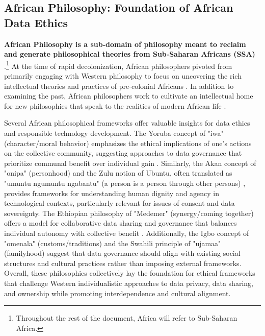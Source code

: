 \subsection{African Philosophy: Foundation of African Data Ethics}
 \textbf{African Philosophy is a sub-domain of philosophy meant to reclaim and generate philosophical theories from Sub-Saharan Africans (SSA)} \cite{ramose2004struggle}.\footnote{Throughout the rest of the document, Africa will refer to Sub-Saharan Africa.} 
At the time of rapid decolonization, African philosophers pivoted from primarily engaging with Western philosophy to focus on uncovering the rich intellectual theories and practices of pre-colonial Africans \cite{wiredu2004akan}. In addition to examining the past, African philosophers work to cultivate an intellectual home for new philosophies that speak to the realities of modern African life \cite{ramose2004struggle, kohnert2022machine}. 

Several African philosophical frameworks offer valuable insights for data ethics and responsible technology development. The Yoruba concept of "iwa" (character/moral behavior) emphasizes the ethical implications of one's actions on the collective community, suggesting approaches to data governance that prioritize communal benefit over individual gain \cite{oyeshile2021yoruba}. Similarly, the Akan concept of "onipa" (personhood) \cite{wingo2006akan, owusu2019onipa} and the Zulu notion of Ubuntu, often translated as "umuntu ngumuntu ngabantu" (a person is a person through other persons) \cite{reviglio2020datafied, gwagwa2022role}, provides frameworks for understanding human dignity and agency in technological contexts, particularly relevant for issues of consent and data sovereignty. The Ethiopian philosophy of "Medemer" (synergy/coming together) offers a model for collaborative data sharing and governance that balances individual autonomy with collective benefit \cite{assefa2024critical}. Additionally, the Igbo concept of "omenala" (customs/traditions) \cite{nwoye2011igbo, nwala1985igbo} and the Swahili principle of "ujamaa" (familyhood) \cite{nyerere1962ujamaa} suggest that data governance should align with existing social structures and cultural practices rather than imposing external frameworks. Overall, these philosophies collectively lay the foundation for ethical frameworks that challenge Western individualistic approaches to data privacy, data sharing, and ownership while promoting interdependence and cultural alignment.
